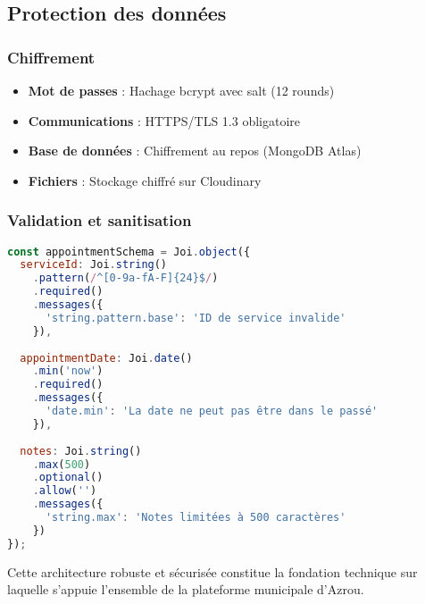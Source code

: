 \subsection{Protection des données}

\subsubsection{Chiffrement}

\begin{itemize}
\item \textbf{Mot de passes} : Hachage bcrypt avec salt (12 rounds)
\item \textbf{Communications} : HTTPS/TLS 1.3 obligatoire
\item \textbf{Base de données} : Chiffrement au repos (MongoDB Atlas)
\item \textbf{Fichiers} : Stockage chiffré sur Cloudinary
\end{itemize}

\subsubsection{Validation et sanitisation}

\begin{lstlisting}[language=JavaScript, caption=Validation des données avec Joi]
const appointmentSchema = Joi.object({
  serviceId: Joi.string()
    .pattern(/^[0-9a-fA-F]{24}$/)
    .required()
    .messages({
      'string.pattern.base': 'ID de service invalide'
    }),
  
  appointmentDate: Joi.date()
    .min('now')
    .required()
    .messages({
      'date.min': 'La date ne peut pas être dans le passé'
    }),
  
  notes: Joi.string()
    .max(500)
    .optional()
    .allow('')
    .messages({
      'string.max': 'Notes limitées à 500 caractères'
    })
});
\end{lstlisting}

Cette architecture robuste et sécurisée constitue la fondation technique sur laquelle s'appuie l'ensemble de la plateforme municipale d'Azrou.

